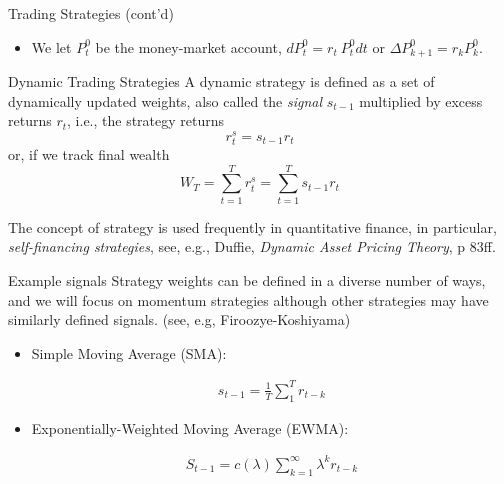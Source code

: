 \begin{frame}{Trading Strategies (cont'd)}
    \begin{itemize}
    \item 
    We let $P_t^0$ be the money-market account,   $dP^0_t = r_t\ P^0_t dt$ or  $\Delta P^0_{k+1} = r_k P^0_k$.
    \end{itemize}    
\end{frame}


\begin{frame}{Dynamic Trading Strategies}
    A dynamic strategy is defined as a set of dynamically updated weights, also called the {\em signal} $s_{t-1}$ multiplied by excess returns $r_{t}$, i.e., the strategy returns 
    $$r^s_t = s_{t-1} r_t$$ or, if we track final wealth
    $$W_T = \sum_{t=1}^T r^s_t = \sum_{t=1}^T s_{t-1} r_t$$
    
    The concept of strategy is used frequently in quantitative finance, in particular, {\em self-financing strategies}, see, e.g., Duffie, {\em Dynamic Asset Pricing Theory}, p 83ff.
\end{frame}


\begin{frame}{Example signals}
Strategy weights can be defined in a diverse number of ways, and we will focus on momentum strategies although other strategies may have similarly defined signals. (see, e.g, Firoozye-Koshiyama)
    \begin{itemize}
    \item 
    Simple Moving Average (SMA): 
    
        \begin{align*}
        s_{t-1}=\frac{1}{T}\sum_1^T r_{t-k}
        \end{align*}
    \item 
    Exponentially-Weighted Moving Average (EWMA): 
        
        \begin{align*}
        S_{t-1}=c(\lambda)\sum_{k=1}^\infty \lambda^k r_{t-k}
        \end{align*}
        
    \end{itemize} 
\end{frame}


